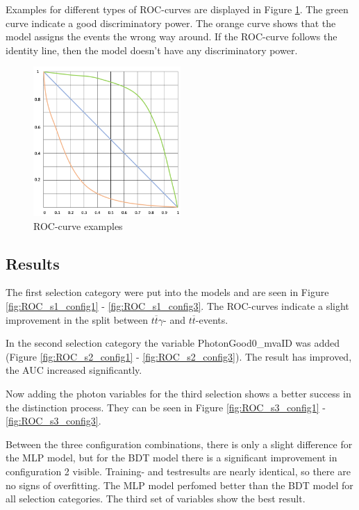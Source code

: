 \documentclass[11pt]{scrartcl}
\begin{document}
Examples for different types of ROC-curves are displayed in Figure \ref{fig:ROC_ex}. The green curve indicate a good discriminatory power. The orange curve shows that the model assigns the events the wrong way around. If the ROC-curve follows the identity line, then the model doesn't have any discriminatory power.

	\begin{figure}[H]
	\centering
	\includegraphics[width=0.5\textwidth]{figures/ROC_curve.png}
	\caption{ROC-curve examples}
	 \label{fig:ROC_ex}	
	\end{figure}
	
	\subsection{Results}
	
	The first selection category were put into the models and are seen in Figure \ref{fig:ROC_s1_config1} - \ref{fig:ROC_s1_config3}. The ROC-curves indicate a slight improvement in the split between $t\overline{t}\gamma$- and $t\overline{t}$-events. 
	
		In the second selection category the variable PhotonGood0\_mvaID was added (Figure \ref{fig:ROC_s2_config1} - \ref{fig:ROC_s2_config3}). The result has improved, the AUC increased significantly.
		
		Now adding the photon variables for the third selection shows a better success in the distinction process. They can be seen in Figure \ref{fig:ROC_s3_config1} - \ref{fig:ROC_s3_config3}. 
		
		Between the three configuration combinations, there is only a slight difference for the MLP model, but for the BDT model there is a significant improvement in configuration 2 visible. Training- and testresults are nearly identical, so there are no signs of overfitting. The MLP model perfomed better than the BDT model for all selection categories. The third set of variables show the best result.
				
\end{document}
